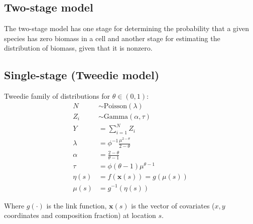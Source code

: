 \documentclass[authoryear, review, 11pt]{elsarticle}
\begin{document}
\subsection{Two-stage model}
The two-stage model has one stage for determining the probability that a given species has zero biomass in a cell and another stage for estimating the distribution of biomass, given that it is nonzero.


\subsection{Single-stage (Tweedie model)}
Tweedie family of distributions for $\theta \in (0,1)$:\\
\begin{equation*}
  \begin{split}
    N &\sim \text{Poisson}(\lambda)    \\
    Z_i &\sim \text{Gamma}(\alpha, \tau)    \\
    Y &= \sum\limits_{i=1}^N Z_i \\
    \lambda &= \phi^{-1} \frac{\mu^{2-\theta}}{2-\theta} \\
    \alpha &= \frac{2-\theta}{\theta-1} \\
    \tau &= \phi (\theta - 1) \mu^{\theta - 1}    \\
    \eta(s) &= f\left(\bm{x}(s)\right) = g\left(\mu(s)\right)\\
    \mu(s) &= g^{-1}\left(\eta(s)\right)
  \end{split}
\end{equation*}

Where $g(\cdot)$ is the link function, $\bm{x}(s)$ is the vector of covariates ($x, y$ coordinates and composition fraction) at location $s$.
\end{document}
